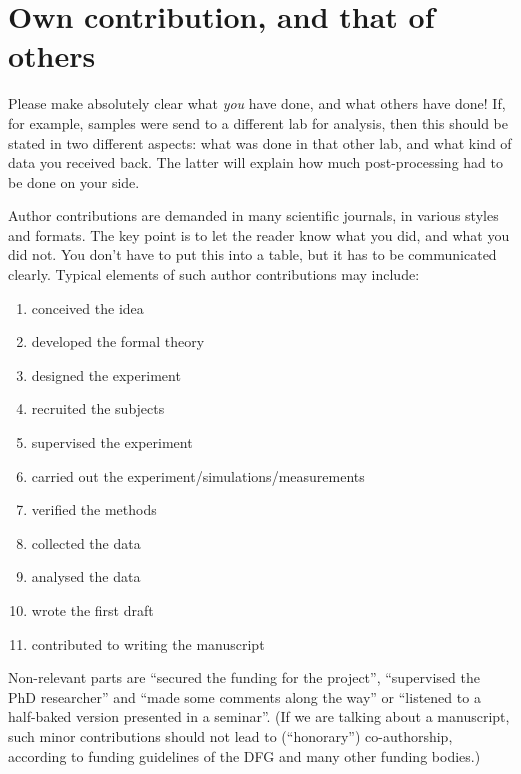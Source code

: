 \section{Own contribution, and that of others}
Please make absolutely clear what \emph{you} have done, and what others have done! If, for example, samples were send to a different lab for analysis, then this should be stated in two different aspects: what was done in that other lab, and what kind of data you received back. The latter will explain how much post-processing had to be done on your side.

Author contributions are demanded in many scientific journals, in various styles and formats. The key point is to let the reader know what you did, and what you did not. You don't have to put this into a table, but it has to be communicated clearly. Typical elements of such author contributions may include:
\begin{enumerate}
	\item conceived the idea
	\item developed the formal theory
	\item designed the experiment
	\item recruited the subjects
	\item supervised the experiment
	\item carried out the experiment/simulations/measurements
	\item verified the methods
	\item collected the data
	\item analysed the data
	\item wrote the first draft
	\item contributed to writing the manuscript
\end{enumerate}
Non-relevant parts are ``secured the funding for the project'', ``supervised the PhD researcher'' and ``made some comments along the way'' or ``listened to a half-baked version presented in a seminar''. (If we are talking about a manuscript, such minor contributions should not lead to (``honorary'') co-authorship, according to funding guidelines of the DFG and many other funding bodies.)